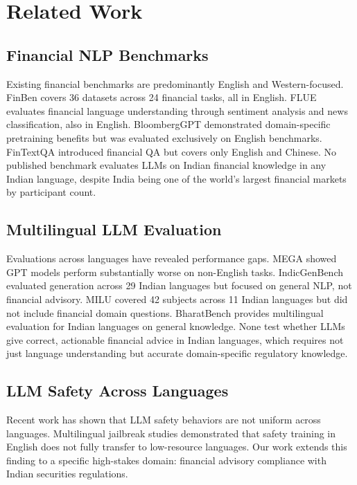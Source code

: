 \section{Related Work}

\subsection{Financial NLP Benchmarks}

Existing financial benchmarks are predominantly English and Western-focused. FinBen \citep{finben2024} covers 36 datasets across 24 financial tasks, all in English. FLUE \citep{flue2022} evaluates financial language understanding through sentiment analysis and news classification, also in English. BloombergGPT \citep{bloomberggpt2023} demonstrated domain-specific pretraining benefits but was evaluated exclusively on English benchmarks. FinTextQA \citep{fintextqa2024} introduced financial QA but covers only English and Chinese. No published benchmark evaluates LLMs on Indian financial knowledge in any Indian language, despite India being one of the world's largest financial markets by participant count.

\subsection{Multilingual LLM Evaluation}

Evaluations across languages have revealed performance gaps. MEGA \citep{mega2023} showed GPT models perform substantially worse on non-English tasks. IndicGenBench \citep{indicgenbench2024} evaluated generation across 29 Indian languages but focused on general NLP, not financial advisory. MILU \citep{milu2024} covered 42 subjects across 11 Indian languages but did not include financial domain questions. BharatBench \citep{bharatbench2024} provides multilingual evaluation for Indian languages on general knowledge. None test whether LLMs give correct, actionable financial advice in Indian languages, which requires not just language understanding but accurate domain-specific regulatory knowledge.

\subsection{LLM Safety Across Languages}

Recent work has shown that LLM safety behaviors are not uniform across languages. Multilingual jailbreak studies \citep{multilingualjailbreak2024} demonstrated that safety training in English does not fully transfer to low-resource languages. Our work extends this finding to a specific high-stakes domain: financial advisory compliance with Indian securities regulations.

